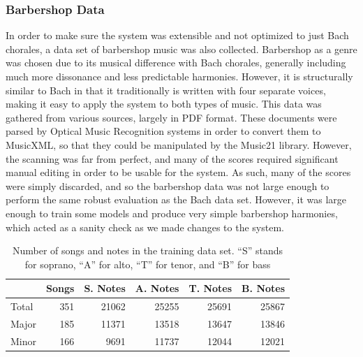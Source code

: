 \documentclass{sig-alternate}
\begin{document}
\subsubsection{Barbershop Data}
In order to make sure the system was extensible and not optimized to just Bach chorales, a data set of barbershop music was also collected. Barbershop as a genre was chosen due to its musical difference with Bach chorales, generally including much more dissonance and less predictable harmonies. However, it is structurally similar to Bach in that it traditionally is written with four separate voices, making it easy to apply the system to both types of music. This data was gathered from various sources, largely in PDF format. These documents were parsed by Optical Music Recognition systems in order to convert them to MusicXML, so that they could be manipulated by the Music21 library. However, the scanning was far from perfect, and many of the scores required significant manual editing in order to be usable for the system. As such, many of the scores were simply discarded, and so the barbershop data was not large enough to perform the same robust evaluation as the Bach data set. However, it was large enough to train some models and produce very simple barbershop harmonies, which acted as a sanity check as we made changes to the system.

\begin{table}
  \begin{center}
      \begin{tabular}{| l | r | r | r | r | r |}
      \hline
       \  & Songs & S. Notes & A. Notes & T. Notes & B. Notes \\ \hline
       Total &  351 & 21062 & 25255 & 25691 & 25867 \\ 
       Major &  185 & 11371 & 13518 & 13647 & 13846 \\ 
       Minor & 166 & 9691 & 11737 & 12044 & 12021  \\ \hline
      \end{tabular}
  \end{center}
  \caption{Number of songs and notes in the training data set. ``S'' stands for soprano, ``A'' for alto, ``T'' for tenor, and ``B'' for bass}
\end{table}
\end{document}
